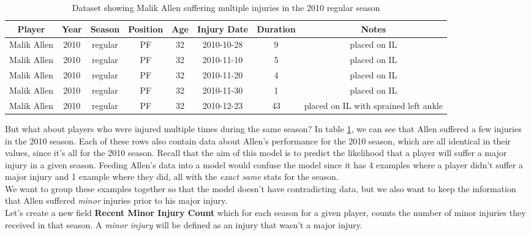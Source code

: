 \documentclass{article}
\begin{document}
\begin{center}
    \begin{table}
    \begin{tabular}{||c c c c c c c c||}
    \hline
    Player & Year & Season & Position & Age & Injury Date & Duration & Notes \\ [0.5ex]
    \hline\hline
    Malik Allen & 2010 & regular & PF & 32 & 2010-10-28 & 9 & placed on IL \\
    \hline
    Malik Allen & 2010 & regular & PF & 32 & 2010-11-10 & 5 & placed on IL \\
    \hline
    Malik Allen & 2010 & regular & PF & 32 & 2010-11-20 & 4 & placed on IL \\
    \hline
    Malik Allen & 2010 & regular & PF & 32 & 2010-11-30 & 1 & placed on IL \\
    \hline
    Malik Allen & 2010 & regular & PF & 32 & 2010-12-23 & 43 & placed on IL with sprained left ankle\\ [1ex]
    \hline
   \end{tabular}
   \caption{\label{tab:multiple-injuries}Dataset showing Malik Allen suffering multiple injuries in the 2010 regular season}
    \end{table}
\end{center}

But what about players who were injured multiple times during the same season? In table \ref{tab:multiple-injuries}, we can see
that Allen suffered a few injuries in the 2010 season. Each of these rows also contain data about 
Allen's performance for the 2010 season, which are all identical in their values, since it's all for the
2010 season. Recall that the aim of this model is to predict the likelihood that 
a player will suffer a major injury in a given season. Feeding Allen's data into a model 
would confuse the model since it has 4 examples where a player didn't suffer a major injury
and 1 example where they did, all with the \emph{exact same} stats for the season.\\

We want to group these examples together so that the model doesn't have contradicting data,
but we also want to keep the information that Allen suffered \emph{minor} injuries
prior to his major injury.\\

Let's create a new field \textbf{Recent Minor Injury Count} which for each
season for a given player, counts the number of minor injuries they received in that season. 
A \emph{minor injury} will be defined as an injury that wasn't a major injury.
\end{document}
